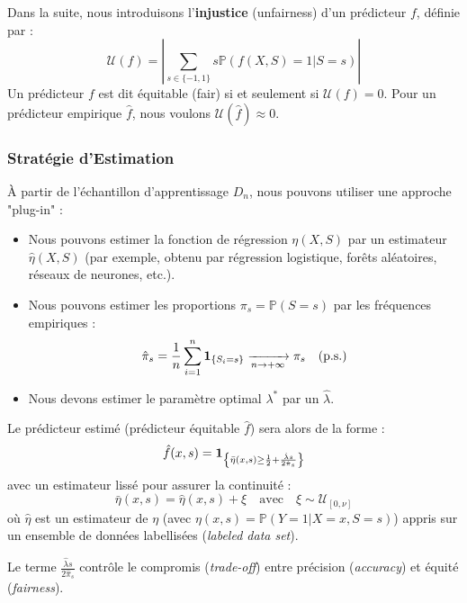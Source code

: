 Dans la suite, nous introduisons l'\textbf{injustice} (unfairness) d'un prédicteur $f$, définie par :
\begin{equation}
    \mathcal{U}(f) = \left| \sum_{s \in \{-1, 1\}} s \mathbb{P}(f(X,S)=1 | S=s) \right|
\end{equation}
Un prédicteur $f$ est dit équitable (fair) si et seulement si $\mathcal{U}(f) = 0$.
Pour un prédicteur empirique $\hat{f}$, nous voulons $\mathcal{U}(\hat{f}) \approx 0$.

\subsubsection{Stratégie d'Estimation}

À partir de l'échantillon d'apprentissage $D_n$, nous pouvons utiliser une approche "plug-in" :

\begin{itemize}
    \item Nous pouvons estimer la fonction de régression $\eta(X,S)$ par un estimateur $\hat{\eta}(X,S)$ (par exemple, obtenu par régression logistique, forêts aléatoires, réseaux de neurones, etc.).
    \item Nous pouvons estimer les proportions $\pi_s = \mathbb{P}(S=s)$ par les fréquences empiriques :
    \[
    \hat{\pi}_s = \frac{1}{n} \sum_{i=1}^n \mathbf{1}_{\{S_i = s\}} \xrightarrow[n \to +\infty]{} \pi_s \quad (\text{p.s.})
    \]
    \item Nous devons estimer le paramètre optimal $\lambda^*$ par un $\hat{\lambda}$.
\end{itemize}

Le prédicteur estimé (prédicteur équitable $\hat{f}$) sera alors de la forme :
\begin{equation}
    \hat{f}(x, s) = \mathbf{1}_{\left\{ \bar{\eta}(x, s) \ge \frac{1}{2} + \frac{\hat{\lambda} s}{2\hat{\pi}_s} \right\}}
\end{equation}
avec un estimateur lissé pour assurer la continuité :
\begin{equation}
    \bar{\eta}(x, s) = \hat{\eta}(x, s) + \xi \quad \text{avec} \quad \xi \sim \mathcal{U}_{[0, \nu]}
\end{equation}
où $\hat{\eta}$ est un estimateur de $\eta$ (avec $\eta(x,s) = \mathbb{P}(Y=1|X=x,S=s)$) appris sur un ensemble de données labellisées (\textit{labeled data set}).

Le terme $\frac{\hat{\lambda} s}{2\hat{\pi}_s}$ contrôle le compromis (\textit{trade-off}) entre précision (\textit{accuracy}) et équité (\textit{fairness}).

